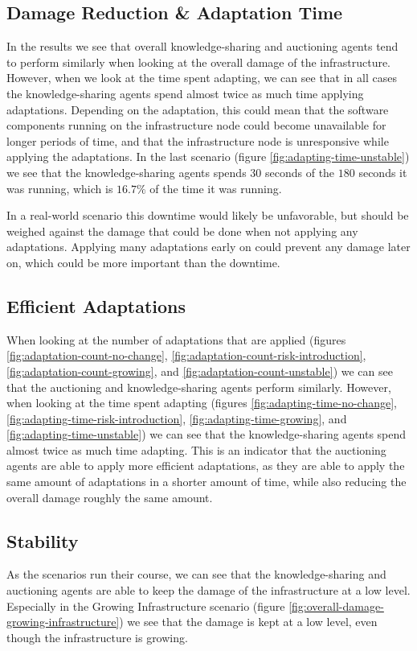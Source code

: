 \subsection{Damage Reduction \& Adaptation Time}
In the results we see that overall knowledge-sharing and auctioning agents tend to perform similarly when looking at the overall damage of the infrastructure. However, when we look at the time spent adapting, we can see that in all cases the knowledge-sharing agents spend almost twice as much time applying adaptations.
Depending on the adaptation, this could mean that the software components running on the infrastructure node could become unavailable for longer periods of time, and that the infrastructure node is unresponsive while applying the adaptations.  In the last scenario (figure \ref{fig:adapting-time-unstable}) we see that the knowledge-sharing agents spends $30$ seconds of the $180$ seconds it was running, which is $16.7\%$ of the time it was running. 

In a real-world scenario this downtime would likely be unfavorable, but should be weighed against the damage that could be done when not applying any adaptations. Applying many adaptations early on could prevent any damage later on, which could be more important than the downtime.


\subsection{Efficient Adaptations}
When looking at the number of adaptations that are applied (figures \ref{fig:adaptation-count-no-change}, \ref{fig:adaptation-count-risk-introduction}, \ref{fig:adaptation-count-growing}, and \ref{fig:adaptation-count-unstable}) we can see that the auctioning and knowledge-sharing agents perform similarly. However, when looking at the time spent adapting (figures \ref{fig:adapting-time-no-change}, \ref{fig:adapting-time-risk-introduction}, \ref{fig:adapting-time-growing}, and \ref{fig:adapting-time-unstable}) we can see that the knowledge-sharing agents spend almost twice as much time adapting. This is an indicator that the auctioning agents are able to apply more efficient adaptations, as they are able to apply the same amount of adaptations in a shorter amount of time, while also reducing the overall damage roughly the same amount.

\subsection{Stability}
\label{ssec:stability}
As the scenarios run their course, we can see that the knowledge-sharing and auctioning agents are able to keep the damage of the infrastructure at a low level. Especially in the Growing Infrastructure scenario (figure \ref{fig:overall-damage-growing-infrastructure}) we see that the damage is kept at a low level, even though the infrastructure is growing. 

